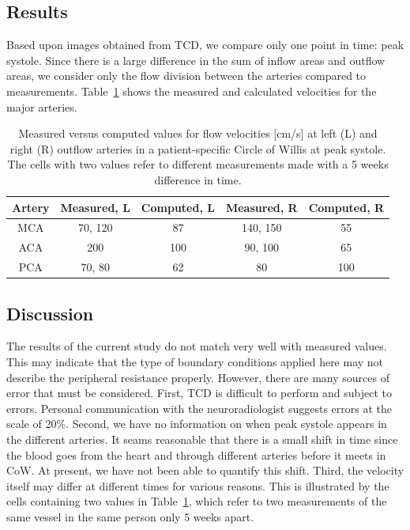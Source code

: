 \subsection{Results}

Based upon images obtained from TCD, we compare only one point in
time: peak systole. Since there is a large difference in the sum of
inflow areas and outflow areas, we consider only the flow division
between the arteries compared to measurements.
Table~\ref{measure_vs_comp} shows the measured and calculated
velocities for the major arteries.


\begin{table}
  \begin{tabular}  {  c | c | c | c | c }
    Artery &Measured, L&Computed, L &Measured, R&Computed, R \\
    \hline
    MCA & 70, 120 		& 87  & 140, 150 	& 55	\\
    ACA & 200  		& 100  	& 90, 100 	& 65	\\
    PCA & 70, 80  		& 62 	& 80  		& 100  \\
  \end{tabular}
  \caption{Measured versus computed values for flow
    velocities [cm/s] at left (L) and right (R) outflow arteries in a patient-specific Circle of Willis at peak
    systole. The cells with two values refer to different measurements
    made with a 5 weeks difference in time.}
  \label{measure_vs_comp}
\end{table}

\subsection{Discussion}

The results of the current study do not match very well with measured
values. This may indicate that the type of boundary conditions applied
here may not describe the peripheral resistance properly. However,
there are many sources of error that must be considered.  First, TCD
is difficult to perform and subject to errors. Personal communication
with the neuroradiologist suggests errors at the scale of 20\%.
Second, we have no information on when peak systole appears in the
different arteries. It seams reasonable that there is a small shift in
time since the blood goes from the heart and through different
arteries before it meets in CoW. At present, we have not been able to
quantify this shift. Third, the velocity itself may differ at
different times for various reasons. This is illustrated by the cells
containing two values in Table~\ref{measure_vs_comp}, which refer to
two measurements of the same vessel in the same person only 5 weeks
apart.

